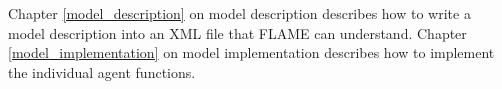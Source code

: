 Chapter \ref{model_description} on model description describes how to write a
model description into an XML file that FLAME can understand. Chapter
\ref{model_implementation} on model implementation describes how to implement
the individual agent functions. 

% 
% 
% 
% 
